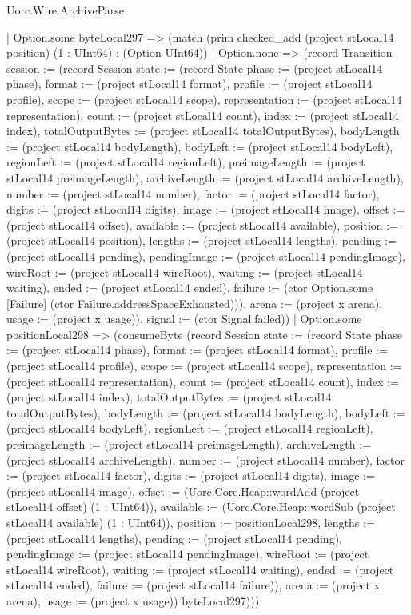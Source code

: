 \begin{lexlean}{Uorc.Wire.ArchiveParse}
\begin{semanticmodule}
{              | Option.some byteLocal297 => (match (prim checked_add (project stLocal14 position) (1 : UInt64) : (Option UInt64))
                | Option.none => (record Transition {session := (record Session {state := (record State {phase := (project stLocal14 phase), format := (project stLocal14 format), profile := (project stLocal14 profile), scope := (project stLocal14 scope), representation := (project stLocal14 representation), count := (project stLocal14 count), index := (project stLocal14 index), totalOutputBytes := (project stLocal14 totalOutputBytes), bodyLength := (project stLocal14 bodyLength), bodyLeft := (project stLocal14 bodyLeft), regionLeft := (project stLocal14 regionLeft), preimageLength := (project stLocal14 preimageLength), archiveLength := (project stLocal14 archiveLength), number := (project stLocal14 number), factor := (project stLocal14 factor), digits := (project stLocal14 digits), image := (project stLocal14 image), offset := (project stLocal14 offset), available := (project stLocal14 available), position := (project stLocal14 position), lengths := (project stLocal14 lengths), pending := (project stLocal14 pending), pendingImage := (project stLocal14 pendingImage), wireRoot := (project stLocal14 wireRoot), waiting := (project stLocal14 waiting), ended := (project stLocal14 ended), failure := (ctor Option.some [Failure] (ctor Failure.addressSpaceExhausted))}), arena := (project x arena), usage := (project x usage)}), signal := (ctor Signal.failed)})
                | Option.some positionLocal298 => (consumeByte (record Session {state := (record State {phase := (project stLocal14 phase), format := (project stLocal14 format), profile := (project stLocal14 profile), scope := (project stLocal14 scope), representation := (project stLocal14 representation), count := (project stLocal14 count), index := (project stLocal14 index), totalOutputBytes := (project stLocal14 totalOutputBytes), bodyLength := (project stLocal14 bodyLength), bodyLeft := (project stLocal14 bodyLeft), regionLeft := (project stLocal14 regionLeft), preimageLength := (project stLocal14 preimageLength), archiveLength := (project stLocal14 archiveLength), number := (project stLocal14 number), factor := (project stLocal14 factor), digits := (project stLocal14 digits), image := (project stLocal14 image), offset := (Uorc.Core.Heap::wordAdd (project stLocal14 offset) (1 : UInt64)), available := (Uorc.Core.Heap::wordSub (project stLocal14 available) (1 : UInt64)), position := positionLocal298, lengths := (project stLocal14 lengths), pending := (project stLocal14 pending), pendingImage := (project stLocal14 pendingImage), wireRoot := (project stLocal14 wireRoot), waiting := (project stLocal14 waiting), ended := (project stLocal14 ended), failure := (project stLocal14 failure)}), arena := (project x arena), usage := (project x usage)}) byteLocal297)))
}
\end{semanticmodule}
\end{lexlean}

